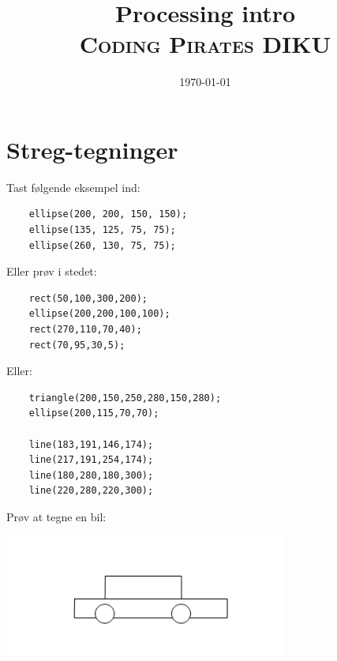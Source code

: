 \documentclass[oneside,a4paper,10pts,article]{memoir}
\title{Processing intro
  \\ {\normalfont\small\scshape Coding Pirates DIKU }} \date{\today}
\begin{document}
\maketitle



\chapter{Streg-tegninger}
Tast følgende eksempel ind:
\begin{lstlisting}
    ellipse(200, 200, 150, 150);
    ellipse(135, 125, 75, 75);
    ellipse(260, 130, 75, 75);
\end{lstlisting}
Eller prøv i stedet:
\begin{lstlisting}
    rect(50,100,300,200);
    ellipse(200,200,100,100);
    rect(270,110,70,40);
    rect(70,95,30,5);
\end{lstlisting}
Eller:
\begin{lstlisting}
    triangle(200,150,250,280,150,280);
    ellipse(200,115,70,70);

    line(183,191,146,174);
    line(217,191,254,174);
    line(180,280,180,300);
    line(220,280,220,300);
\end{lstlisting}

\vspace{1cm}
\noindent
Prøv at tegne en bil:

\includegraphics[width=0.7\textwidth]{pics/bil-streg.png}
\end{document}
